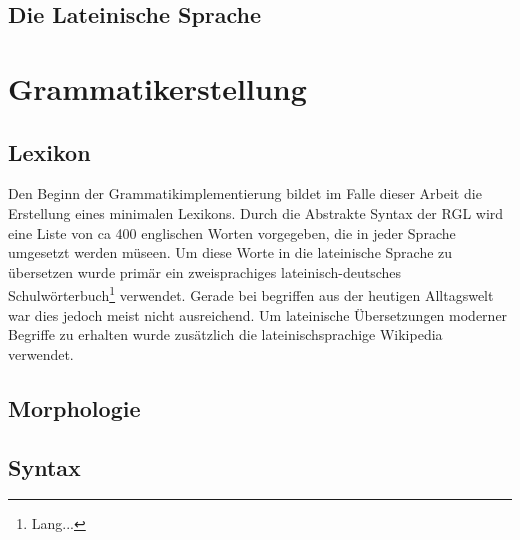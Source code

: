 \documentclass[draft,11pt]{amsbook}
\begin{document}
\subsection{Die Lateinische Sprache}
\section{Grammatikerstellung}
\subsection{Lexikon}
Den Beginn der Grammatikimplementierung bildet im Falle dieser Arbeit die Erstellung eines minimalen Lexikons. Durch die Abstrakte Syntax der RGL wird eine Liste von ca 400 englischen Worten vorgegeben, die in jeder Sprache umgesetzt werden müseen. Um diese Worte in die lateinische Sprache zu übersetzen wurde primär ein zweisprachiges lateinisch-deutsches Schulwörterbuch\footnote{Lang...} verwendet. Gerade bei begriffen aus der heutigen Alltagswelt war dies jedoch meist nicht ausreichend. Um lateinische Übersetzungen moderner Begriffe zu erhalten wurde zusätzlich die lateinischsprachige Wikipedia verwendet.
\subsection{Morphologie}
\subsection{Syntax}
\end{document}

